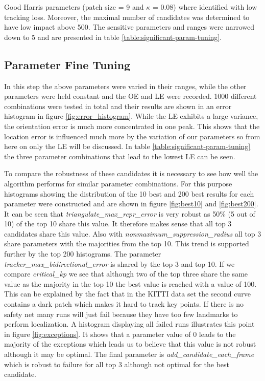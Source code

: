 \medskip

Good Harris parameters (patch size = 9 and $\kappa$ =  0.08) where identified with low tracking loss. 
Moreover, the maximal number of candidates was determined to have low impact above 500. 
The sensitive parameters and ranges were narrowed down to 5 and are presented in table \ref{table:significant-param-tuning}.

\subsection{Parameter Fine Tuning}  

In this step the above parameters were varied in their ranges, while the other parameters were held constant and the OE and LE were recorded. 
1000 different combinations were tested in total and their results are shown in an error histogram in figure \ref{fig:error_histogram}. 
While the LE exhibits a large variance, the orientation error is much more concentrated in one peak. 
This shows that the location error is influenced much more by the variation of our parameters so from here on only the LE will be discussed.
In table \ref{table:significant-param-tuning} the three parameter combinations that lead to the lowest LE can be seen. \par
To compare the robustness of these candidates it is necessary to see how well the algorithm performs for similar parameter combinations. 
For this purpose histograms showing the distribution of the 10 best and 200 best results for each parameter were constructed and are shown in figure \ref{fig:best10} and \ref{fig:best200}.
It can be seen that \emph{triangulate\_max\_repr\_error} is very robust as 50\% (5 out of 10) of the top 10 share this value. 
It therefore makes sense that all top 3 candidates share this value. 
Also with \emph{nonmaximum\_suppression\_radius} all top 3 share parameters with the majorities from the top 10. 
This trend is supported further by the top 200 histograms.
The parameter \emph{tracker\_max\_bidirectional\_error} is shared by the top 3 and top 10. 
If we compare \emph{critical\_kp} we see that although two of the top three share the same value as the majority in the top 10 the best value is reached with a value of 100.
This can be explained by the fact that in the KITTI data set the second curve contains a dark patch which makes it hard to track key points. 
If there is no safety net many runs will just fail because they have too few landmarks to perform localization. 
A histogram displaying all failed runs illustrates this point in figure  \ref{fig:exceptions}. 
It shows that a parameter value of 0 leads to the majority of the exceptions which leads us to believe that this value is not robust although it may be optimal. 
The final parameter is \emph{add\_candidate\_each\_frame} which is robust to failure for all top 3 although not optimal for the best candidate.

